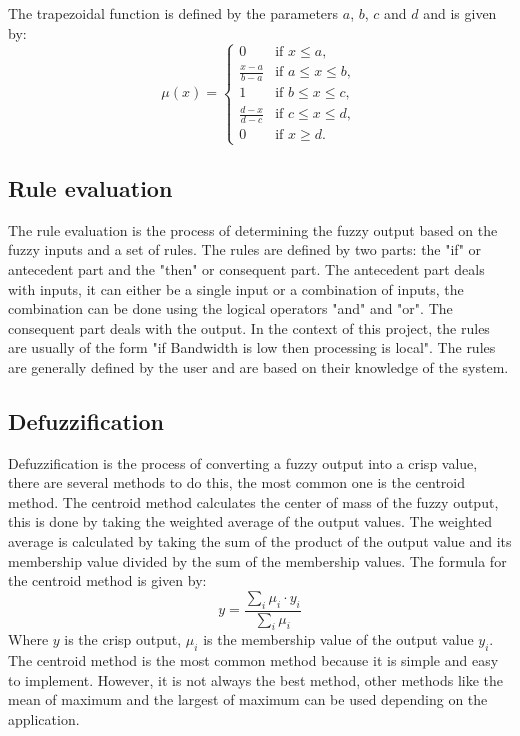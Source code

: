 The trapezoidal function is defined by the parameters $a$, $b$, $c$ and $d$ and is given by:
\begin{equation}
	\mu(x) = \begin{cases}
		0                   & \text{if } x \leq a,        \\
		\frac{x - a}{b - a} & \text{if } a \leq x \leq b, \\
		1                   & \text{if } b \leq x \leq c, \\
		\frac{d - x}{d - c} & \text{if } c \leq x \leq d, \\
		0                   & \text{if } x \geq d.
	\end{cases}
\end{equation}

\subsection*{Rule evaluation}

The rule evaluation is the process of determining the fuzzy output based on the fuzzy inputs and a set of rules. The rules are defined by two parts:
the "if" or antecedent part and the "then" or consequent part. The antecedent part deals with inputs, it can either be a single input or a combination
of inputs, the combination can be done using the logical operators "and" and "or". The consequent part deals with the output. In the context of this
project, the rules are usually of the form "if Bandwidth is low then processing is local". The rules are generally defined by the user and are based
on their knowledge of the system.

\subsection*{Defuzzification}

Defuzzification is the process of converting a fuzzy output into a crisp value, there are several methods to do this, the most common one is the
centroid method. The centroid method calculates the center of mass of the fuzzy output, this is done by taking the weighted average of the output
values. The weighted average is calculated by taking the sum of the product of the output value and its membership value divided by the sum of the
membership values. The formula for the centroid method is given by:
\begin{equation}
	y = \frac{\sum_{i} \mu_i \cdot y_i}{\sum_{i} \mu_i}
\end{equation}
Where $y$ is the crisp output, $\mu_i$ is the membership value of the output value $y_i$. The centroid method is the most common method because it
is simple and easy to implement. However, it is not always the best method, other methods like the mean of maximum and the largest of maximum can
be used depending on the application.

